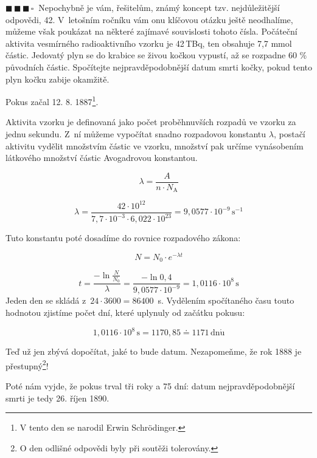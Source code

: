 \documentclass{book}
\newcommand{\tri}{$\blacksquare \, \blacksquare \, \blacksquare \, \square \; \; $}
\renewenvironment{quotation}{\par}{\par} %
\begin{document}
\hrulefill %
\begin{quotation}
\tri Nepochybně je vám, řešitelům, známý koncept tzv. nejdůležitější odpovědi,
42. V~letošním ročníku vám onu klíčovou otázku ještě neodhalíme, můžeme
však poukázat na některé zajímavé souvislosti tohoto čísla. Počáteční
aktivita vesmírného radioaktivního vzorku je 42\,TBq, ten obsahuje
7,7 mmol částic. Jedovatý plyn se do krabice se živou kočkou vypustí,
až se rozpadne 60 \% původních částic. Spočítejte nejpravděpodobnější
datum smrti kočky, pokud tento plyn kočku zabije okamžitě. 

Pokus začal 12. 8. 1887\footnote{V tento den se narodil Erwin Schrödinger.}.
\end{quotation} \dotfill \par 

\newpage %
Aktivita vzorku je definovaná jako počet proběhnuvších rozpadů ve
vzorku za jednu sekundu. Z~ní můžeme vypočítat snadno rozpadovou konstantu
$\lambda$, postačí aktivitu vydělit množstvím částic ve vzorku, množství pak určíme vynásobením látkového množství částic Avogadrovou konstantou.

\[
\lambda = \frac{A}{n\cdot N_\mathrm{A}}
\]

\[
\lambda=\frac{42\cdot10^{12}}{7,7\cdot10^{-3}\cdot6,022\cdot10^{23}}=9,0577\cdot10^{-9}\,\mathrm{s^{-1}}
\]


Tuto konstantu poté dosadíme do rovnice rozpadového zákona:

\[
N=N_{0}\cdot e^{-\lambda t}
\]

\[
t=\frac{-\ln\frac{N}{N_{0}}}{\lambda}=\frac{-\ln0,4}{9,0577\cdot10^{-9}}=1,0116\cdot10^{8}\,\mathrm{s}
\]
Jeden den se skládá z~$24\cdot3600=86400$~s. Vydělením spočítaného
času touto hodnotou zjistíme počet dní, které uplynuly od začátku
pokusu:

\[
1,0116\cdot10^{8}\,\mathrm{s}=1170,85\doteq1171\,\mathrm{dn\mathring{u}}
\]

Teď už jen zbývá dopočítat, jaké to bude datum. Nezapomeňme, že rok
1888 je přestupný\footnote{O den odlišné odpovědi byly při soutěži tolerovány.}!

Poté nám vyjde, že pokus trval tři roky a 75 dní: datum nejpravděpodobnější
smrti je tedy 26. říjen 1890.
\end{document}
